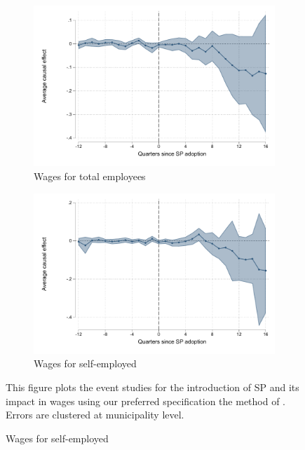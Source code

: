 \documentclass[oneside,11pt]{article}
\begin{document}
\begin{figure}[H]
     \caption{Event studies - wages}
    \label{es_sal}
\begin{center}
       \begin{subfigure}{0.45\textwidth}
       \caption{Wages for total employees}
        \includegraphics[width=\textwidth]{Figuras/did_event_ch_lg1_masa_sal_ta.pdf}
    \end{subfigure}
       \begin{subfigure}{0.45\textwidth}
       \caption{Wages for self-employed}
        \includegraphics[width=\textwidth]{Figuras/did_event_ch_lg1_masa_sal_ta_1.pdf}
    \end{subfigure}
  \end{center}
    \scriptsize 
    
This figure plots the event studies for the introduction of SP and its impact in wages using our preferred specification the method of \cite{deChaisemartin2020}. Errors are clustered at municipality level.

\end{figure}
\end{document}
